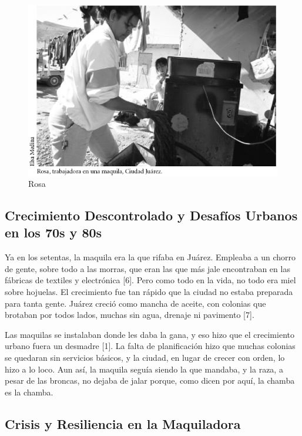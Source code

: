\documentclass[
  10pt,
  letterpaper,
]{book}
\begin{document}
\begin{figure}[H]

{\centering \includegraphics{Img/Rosa.jpg}

}

\caption{Rosa}

\end{figure}%

\subsection{Crecimiento Descontrolado y Desafíos Urbanos en los 70s y
80s}\label{crecimiento-descontrolado-y-desafuxedos-urbanos-en-los-70s-y-80s}

Ya en los setentas, la maquila era la que rifaba en Juárez. Empleaba a
un chorro de gente, sobre todo a las morras, que eran las que más jale
encontraban en las fábricas de textiles y electrónica {[}6{]}. Pero como
todo en la vida, no todo era miel sobre hojuelas. El crecimiento fue tan
rápido que la ciudad no estaba preparada para tanta gente. Juárez creció
como mancha de aceite, con colonias que brotaban por todos lados, muchas
sin agua, drenaje ni pavimento {[}7{]}.

Las maquilas se instalaban donde les daba la gana, y eso hizo que el
crecimiento urbano fuera un desmadre {[}1{]}. La falta de planificación
hizo que muchas colonias se quedaran sin servicios básicos, y la ciudad,
en lugar de crecer con orden, lo hizo a lo loco. Aun así, la maquila
seguía siendo la que mandaba, y la raza, a pesar de las broncas, no
dejaba de jalar porque, como dicen por aquí, la chamba es la chamba.

\subsection{Crisis y Resiliencia en la
Maquiladora}\label{crisis-y-resiliencia-en-la-maquiladora}
\end{document}
